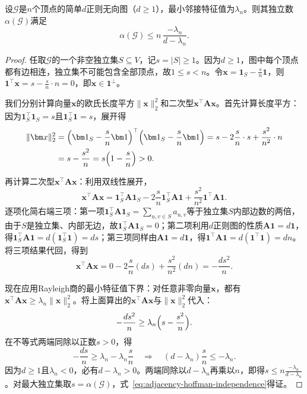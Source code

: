 \begin{theorem}[独立数的Hoffman界]
\label{thm:adjacency-hoffman-independence}
设$\mathcal G$是$n$个顶点的简单$d$正则无向图（$d\geq 1$），最小邻接特征值为$\lambda_n$。则其独立数$\alpha(\mathcal G)$满足
\begin{equation}
\alpha(\mathcal G)\leq n\,\frac{-\lambda_n}{d-\lambda_n}.
\label{eq:adjacency-hoffman-independence}
\end{equation}
\end{theorem}

\begin{proof}
任取$\mathcal G$的一个非空独立集$S\subseteq V$，记$s=|S|\geq 1$。因为$d\geq 1$，图中每个顶点都有边相连，独立集不可能包含全部顶点，故$1\leq s<n$。令$\bm x=\bm 1_S-\frac{s}{n}\bm 1$，则$\bm 1^\top\bm x=s-\frac{s}{n}\cdot n=0$，即$\bm x\in\bm 1^\perp$。

我们分别计算向量$\bm x$的欧氏长度平方$\|\bm x\|_2^2$和二次型$\bm x^\top\bm A\bm x$。首先计算长度平方：因为$\bm 1_S^\top\bm 1_S=s$且$\bm 1_S^\top\bm 1=s$，展开得
\[
\begin{aligned}
\|\bm x\|_2^2
&=\Bigl(\bm 1_S-\frac{s}{n}\bm 1\Bigr)^\top\Bigl(\bm 1_S-\frac{s}{n}\bm 1\Bigr)
=s-2\frac{s}{n}\cdot s+\frac{s^2}{n^2}\cdot n\\
&=s-\frac{s^2}{n}
=s\Bigl(1-\frac{s}{n}\Bigr)>0.
\end{aligned}
\]

再计算二次型$\bm x^\top\bm A\bm x$：利用双线性展开，
\[
\bm x^\top\bm A\bm x
=\bm 1_S^\top\bm A\bm 1_S
-2\frac{s}{n}\bm 1_S^\top\bm A\bm 1
+\frac{s^2}{n^2}\bm 1^\top\bm A\bm 1.
\]
逐项化简右端三项：第一项$\bm 1_S^\top\bm A\bm 1_S=\sum_{u,v\in S}a_{u,v}$等于独立集$S$内部边数的两倍，由于$S$是独立集、内部无边，故$\bm 1_S^\top\bm A\bm 1_S=0$；第二项利用$d$正则图的性质$\bm A\bm 1=d\bm 1$，得$\bm 1_S^\top\bm A\bm 1=d(\bm 1_S^\top\bm 1)=ds$；第三项同样由$\bm A\bm 1=d\bm 1$，得$\bm 1^\top\bm A\bm 1=d(\bm 1^\top\bm 1)=dn$。将三项结果代回，得到
\[
\bm x^\top\bm A\bm x
=0-2\frac{s}{n}(ds)+\frac{s^2}{n^2}(dn)
=-\frac{ds^2}{n}.
\]

现在应用Rayleigh商的最小特征值下界：对任意非零向量$\bm x$，都有$\bm x^\top\bm A\bm x\geq\lambda_n\|\bm x\|_2^2$。将上面算出的$\bm x^\top\bm A\bm x$与$\|\bm x\|_2^2$代入：
\[
-\frac{ds^2}{n}\geq\lambda_n\Bigl(s-\frac{s^2}{n}\Bigr).
\]
在不等式两端同除以正数$s>0$，得
\[
-\frac{ds}{n}\geq\lambda_n-\lambda_n\frac{s}{n}
\quad\Longrightarrow\quad
(d-\lambda_n)\frac{s}{n}\leq -\lambda_n.
\]
因为$d\geq 1$且$\lambda_n<0$，必有$d-\lambda_n>0$。两端同除以$d-\lambda_n$再乘以$n$，即得$s\leq n\frac{-\lambda_n}{d-\lambda_n}$。对最大独立集取$s=\alpha(\mathcal G)$，式~\eqref{eq:adjacency-hoffman-independence}得证。
\end{proof}

